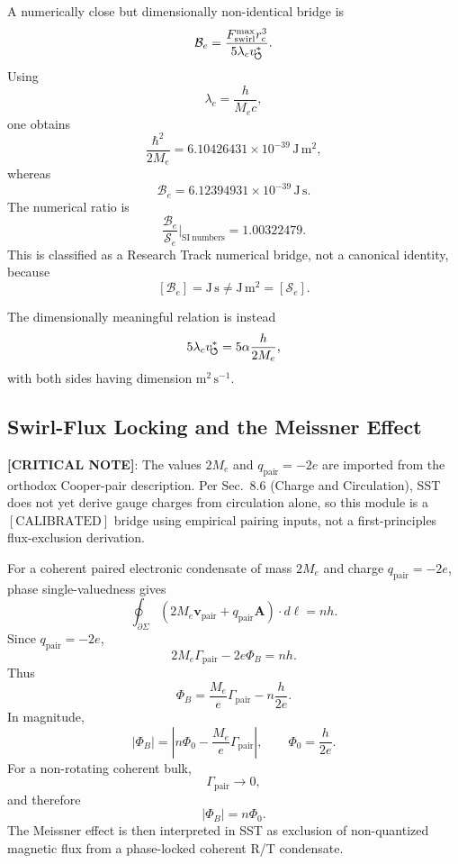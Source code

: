         A numerically close but dimensionally non-identical bridge is
        \[
            \mathcal B_e
            =
            \frac{F_{\text{swirl}}^{\max} r_c^3}
            {5\lambda_cv_{\!\boldsymbol{\circlearrowleft}}^{\ast}}.
        \]
        Using
        \[
            \lambda_c=\frac{h}{M_e c},
        \]
        one obtains
        \[
            \frac{\hbar^2}{2M_e}
            =
            6.10426431\times10^{-39}\,\mathrm{J\,m^2},
        \]
        whereas
        \[
            \mathcal B_e
            =
            6.12394931\times10^{-39}\,\mathrm{J\,s}.
        \]
        The numerical ratio is
        \[
            \frac{\mathcal B_e}{\mathcal S_e}\bigg|_{\mathrm{SI\ numbers}}
            =
            1.00322479.
        \]
        This is classified as a Research Track numerical bridge, not a canonical
        identity, because
        \[
            [\mathcal B_e]=\mathrm{J\,s}
            \neq
            \mathrm{J\,m^2}=[\mathcal S_e].
        \]
        
        The dimensionally meaningful relation is instead
        \[
            5\lambda_cv_{\!\boldsymbol{\circlearrowleft}}^{\ast}
            =
            5\alpha\frac{h}{2M_e},
        \]
        with both sides having dimension \(\mathrm{m^2\,s^{-1}}\).
    
    \subsection{Swirl-Flux Locking and the Meissner Effect}
        \textbf{[CRITICAL NOTE]}: The values $2M_e$ and $q_{\mathrm{pair}}=-2e$ are imported from the orthodox Cooper-pair description. Per Sec.~8.6 (Charge and Circulation), SST does not yet derive gauge charges from circulation alone, so this module is a $[\text{CALIBRATED}]$ bridge using empirical pairing inputs, not a first-principles flux-exclusion derivation.
        
        For a coherent paired electronic condensate of mass \(2M_e\) and charge
        \(q_{\mathrm{pair}}=-2e\), phase single-valuedness gives
        \[
            \oint_{\partial\Sigma}
            \left(
                2M_e\mathbf v_{\mathrm{pair}}
                +
                q_{\mathrm{pair}}\mathbf A
            \right)\cdot d\boldsymbol\ell
            =
            nh .
        \]
        Since \(q_{\mathrm{pair}}=-2e\),
        \[
            2M_e\Gamma_{\mathrm{pair}}
            -
            2e\Phi_B
            =
            nh .
        \]
        Thus
        \[
            \Phi_B
            =
            \frac{M_e}{e}\Gamma_{\mathrm{pair}}
            -
            n\frac{h}{2e}.
        \]
        In magnitude,
        \[
            |\Phi_B|
            =
            \left|
                n\Phi_0
            -
                \frac{M_e}{e}\Gamma_{\mathrm{pair}}
            \right|,
            \qquad
            \Phi_0=\frac{h}{2e}.
        \]
        For a non-rotating coherent bulk,
        \[
            \Gamma_{\mathrm{pair}}\to 0,
        \]
        and therefore
        \[
            |\Phi_B|=n\Phi_0.
        \]
        The Meissner effect is then interpreted in SST as exclusion of non-quantized
        magnetic flux from a phase-locked coherent R/T condensate.
    
